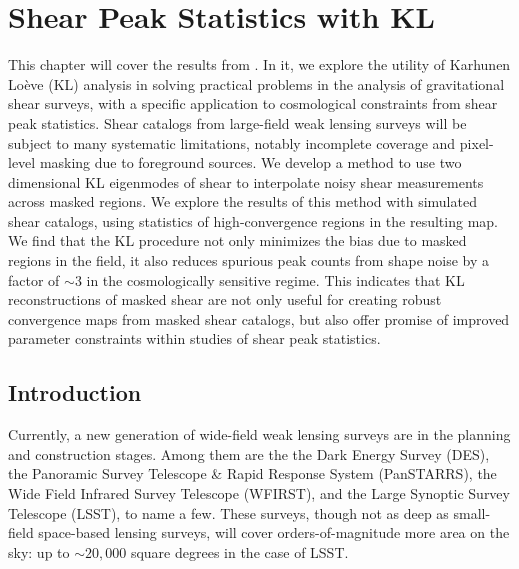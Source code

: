 \chapter{Shear Peak Statistics with KL}

This chapter will cover the results from \citep{Vanderplas2012}. In it,
we explore the utility of Karhunen Lo\`{e}ve (KL) analysis in 
solving practical problems in the analysis of gravitational
shear surveys, with a specific application to cosmological constraints
from shear peak statistics.
Shear catalogs from large-field weak lensing
surveys will be subject to many systematic limitations, notably
incomplete coverage and pixel-level masking due to foreground sources.  
We develop a method to use two dimensional KL eigenmodes of 
shear to interpolate noisy shear measurements across masked regions.  
We explore the results of this method with simulated shear catalogs, 
using statistics of high-convergence regions in the resulting map.  
We find that the KL procedure not only
minimizes the bias due to masked regions in the field, it also reduces
spurious peak counts from shape noise by a factor of $\sim 3$ in the
cosmologically sensitive regime.  This indicates that KL reconstructions 
of masked shear are not only useful for creating robust convergence maps
from masked shear catalogs, but also offer promise of improved parameter
constraints within studies of shear peak statistics.


\section{Introduction}
Currently, a new generation of wide-field weak lensing surveys are
in the planning and construction stages.  
Among them are the the Dark Energy Survey (DES), 
the Panoramic Survey Telescope \& Rapid
Response System (PanSTARRS), the Wide Field Infrared Survey Telescope (WFIRST),
and the Large Synoptic Survey Telescope (LSST), to name a few.
These surveys, though not as deep as small-field space-based lensing surveys,
will cover orders-of-magnitude more area on the sky: up to $\sim 20,000$
square degrees in the case of LSST.

